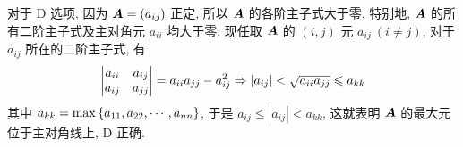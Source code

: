 \begin{solution}
    对于 D 选项, 因为 $\vb*{A}=(a_{ij})$ 正定, 所以 $\vb*{A}$ 的各阶主子式大于零. 特别地, $\vb*{A}$ 的所有二阶主子式及主对角元 $a_{ii}$ 均大于零, 现任取 $\vb*{A}$ 的 $(i,j)$ 元 $a_{ij}~(i\neq j)$, 对于 $a_{ij}$ 所在的二阶主子式, 有 $$
    \mqty|a_{ii}&a_{ij}\\a_{ij}& a_{jj}|=a_{ii}a_{jj}-a_{ij}^2\Rightarrow |a_{ij}|<\sqrt{a_{ii}a_{jj}}\leqslant a_{kk}
    $$
    其中 $a_{kk}=\max\qty{a_{11},a_{22}, \cdots ,a_{nn}}$, 于是 $a_{ij}\leqslant|a_{ij}|<a_{kk}$, 这就表明 $\vb*{A}$ 的最大元位于主对角线上, D 正确.
\end{solution}

